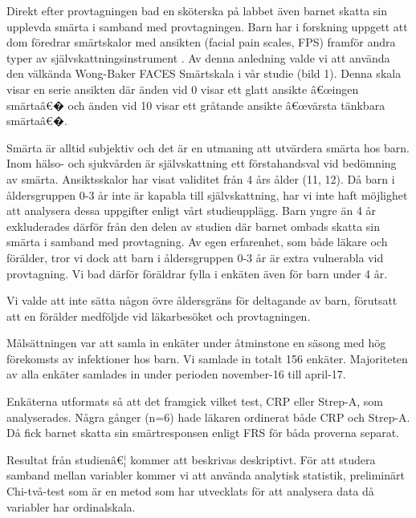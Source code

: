 \documentclass[12pt,twocolumn]{article}
\begin{document}
Direkt efter provtagningen bad en sk\"oterska p\r{a} labbet \"aven barnet skatta
sin upplevda sm\"arta i samband med provtagningen. Barn har i forskning uppgett
att dom f\"oredrar sm\"artskalor med ansikten (facial pain scales, FPS)
framf\"or andra typer av sj\"alvskattningsinstrument \cite{vBayer2006}. Av denna
anledning valde vi att anv\"anda den v\"alk\"anda Wong-Baker FACES Sm\"artskala
i v\r{a}r studie (bild 1). Denna skala visar en serie ansikten d\"ar \"anden vid
0 visar ett glatt ansikte â€œingen sm\"artaâ€� och \"anden vid 10 visar ett
gr\r{a}tande ansikte â€œv\"arsta t\"ankbara sm\"artaâ€�.


Sm\"arta \"ar alltid subjektiv och det \"ar en utmaning att utv\"ardera sm\"arta
hos barn.
Inom h\"also- och sjukv\r{a}rden \"ar sj\"alvskattning ett f\"orstahandsval vid
bed\"omning av sm\"arta. Ansiktsskalor har visat validitet fr\r{a}n 4 \r{a}rs
\r{a}lder (11, 12). D\r{a} barn i \r{a}ldersgruppen 0-3 \r{a}r inte \"ar kapabla
till sj\"alvskattning, har vi inte haft m\"ojlighet att analysera dessa
uppgifter enligt v\r{a}rt studieuppl\"agg. Barn yngre \"an 4 \r{a}r exkluderades
d\"arf\"or fr\r{a}n den delen av studien d\"ar barnet ombads skatta sin sm\"arta
i samband med provtagning. Av egen erfarenhet, som b\r{a}de l\"akare och
f\"or\"alder, tror vi dock att barn i \r{a}ldersgruppen 0-3 \r{a}r \"ar extra
vulnerabla vid provtagning. Vi bad d\"arf\"or f\"or\"aldrar fylla i enk\"aten
\"aven f\"or barn under 4 \r{a}r.

Vi valde att inte s\"atta n\r{a}gon \"ovre \r{a}ldersgr\"ans f\"or deltagande av
barn, f\"orutsatt att en f\"or\"alder medf\"oljde vid l\"akarbes\"oket och
provtagningen.

M\r{a}ls\"attningen var att samla in enk\"ater under \r{a}tminstone en s\"asong
med h\"og f\"orekomsts av infektioner hos barn. Vi samlade in totalt 156
enk\"ater.
Majoriteten av alla enk\"ater samlades in under perioden november-16 till
april-17.

Enk\"aterna utformats s\r{a} att det framgick vilket test, CRP eller Strep-A,
som analyserades. N\r{a}gra g\r{a}nger (n=6) hade l\"akaren ordinerat b\r{a}de
CRP och Strep-A. D\r{a} fick barnet skatta sin sm\"artresponsen enligt FRS f\"or
b\r{a}da proverna separat.

Resultat fr\r{a}n studienâ€¦ kommer att beskrivas deskriptivt. F\"or att studera
samband mellan variabler kommer vi att anv\"anda analytisk statistik,
prelimin\"art Chi-tv\r{a}-test som \"ar en metod som har utvecklats f\"or att
analysera data d\r{a} variabler har ordinalskala.
\end{document}
